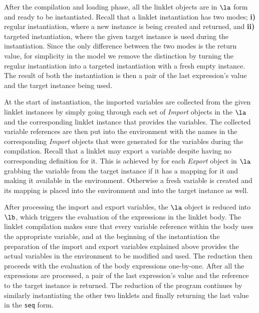 			\begin{paragraph-here}
				After the compilation and loading phase, all the linklet objects are
				in $\la$ form and ready to be instantiated. Recall that a linklet
				instantiation has two modes; \textbf{i)} regular instantiation, where
				a new instance is being created and returned, and \textbf{ii)}
				targeted instantiation, where the given target instance is used during
				the instantiation. Since the only difference between the two modes is
				the return value, for simplicity in the model we remove the
				distinction by turning the regular instantiation into a targeted
				instantiation with a fresh empty instance. The result of both the
				instantiation is then a pair of the last expression's value and the
				target instance being used.
			\end{paragraph-here}

			\begin{paragraph-here}
				At the start of instantiation, the imported variables are collected
				from the given linklet instances by simply going through each set of
				\emph{Import} objects in the $\la$ and the corresponding linklet
				instance that provides the variables. The collected variable
				references are then put into the environment with the names in the
				corresponding \emph{Import} objects that were generated for the
				variables during the compilation. Recall that a linklet may export a
				variable despite having no corresponding definition for it. This is
				achieved by for each \emph{Export} object in $\la$ grabbing the
				variable from the target instance if it has a mapping for it and
				making it available in the environment. Otherwise a fresh variable is
				created and its mapping is placed into the environment and into the
				target instance as well.
			\end{paragraph-here}

			\begin{paragraph-here}
				After processing the import and export variables, the $\la$ object is
				reduced into $\lb$, which triggers the evaluation of the expressions
				in the linklet body. The linklet compilation makes sure that every
				variable reference within the body uses the appropriate variable, and
				at the beginning of the instantiation the preparation of the import
				and export variables explained above provides the actual variables in
				the environment to be modified and used. The reduction then proceeds
				with the evaluation of the body expressions one-by-one. After all the
				expressions are processed, a pair of the last expression's value and
				the reference to the target instance is returned. The reduction of the
				program continues by similarly instantiating the other two linklets
				and finally returning the last value in the
				\verb|seq| form.
			\end{paragraph-here}

